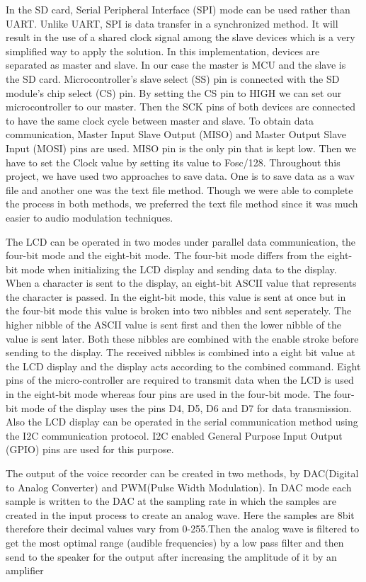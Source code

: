 \documentclass[11pt]{article}
\begin{document}
In the SD card, Serial Peripheral Interface (SPI) mode\cite{SD_Card} can be used rather than UART. Unlike UART, SPI is data transfer in a synchronized method. It will result in the use of a shared clock signal among the slave devices which is a very simplified way to apply the solution. In this implementation, devices are separated as master and slave. In our case the master is MCU and the slave is the SD card. Microcontroller’s slave select (SS) pin is connected with the SD module’s chip select (CS) pin. By setting the CS pin to HIGH we can set our microcontroller to our master. Then the SCK pins of both devices are connected to have the same clock cycle between master and slave. To obtain data communication, Master Input Slave Output (MISO) and Master Output Slave Input (MOSI) pins are used. MISO pin is the only pin that is kept low. Then we have to set the Clock value by setting its value to Fosc/128.  Throughout this project, we have used two approaches to save data. One is to save data as a wav file and another one was the text file method. Though we were able to complete the process in both methods, we preferred the text file method since it was much easier to audio modulation techniques.

The LCD can be operated in two modes under parallel data communication, the four-bit mode and the eight-bit mode. The four-bit mode differs from the eight-bit mode\cite{4bit} when initializing the LCD display and sending data to the display.  When a character is sent to the display, an eight-bit ASCII value that represents the character is passed. In the eight-bit mode, this value is sent at once but in the four-bit mode this value is broken into two nibbles and sent seperately. The higher nibble of the ASCII value is sent first and then the lower nibble of the value is sent later. Both these nibbles are combined with the enable stroke before sending to the display. The received nibbles is combined into a eight bit value at the LCD display and the display acts according to the combined command. Eight pins of the micro-controller are required to transmit data when the LCD is used in the eight-bit mode whereas four pins are used in the four-bit mode. The four-bit mode of the display uses the pins D4, D5, D6 and D7 for data transmission. Also the LCD display can be operated in the serial communication method using the I2C communication protocol. I2C enabled General Purpose Input Output (GPIO) pins are used for this purpose.  

The output of the voice recorder can be created in two methods, by DAC(Digital to Analog Converter)  and PWM(Pulse Width Modulation)\cite{pwm}. In DAC mode each sample is written to the DAC at the sampling rate in which the samples are created in the input process to create an analog wave. Here the samples are 8bit therefore their decimal values vary from 0-255.Then the analog wave is filtered to get the most optimal range (audible frequencies) by a low pass filter and then send to the speaker for the output after increasing the amplitude of it by an amplifier
\end{document}
